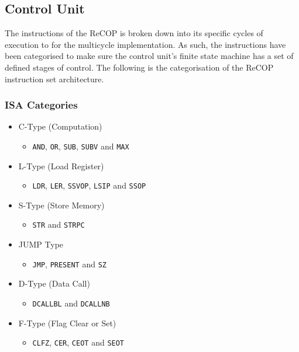 \documentclass[]{article}
\begin{document}
	\subsection{Control Unit}
	The instructions of the ReCOP is broken down into its specific cycles of execution to for the multicycle implementation. As such, the instructions have been categorised to make sure the control unit’s finite state machine has a set of defined stages of control. The following is the categorisation of the ReCOP instruction set architecture.
	
	\subsubsection{ISA Categories}
	\begin{itemize}
		\item C-Type (Computation)
		\begin{itemize}
			\item \texttt{AND}, \texttt{OR}, \texttt{SUB}, \texttt{SUBV} and \texttt{MAX} 
		\end{itemize}
		
		\item L-Type (Load Register)
		\begin{itemize}
			\item \texttt{LDR}, \texttt{LER}, \texttt{SSVOP}, \texttt{LSIP} and \texttt{SSOP}
		\end{itemize}
		
		\item S-Type (Store Memory)
		\begin{itemize}
			\item \texttt{STR} and \texttt{STRPC}
		\end{itemize}
		
		\item JUMP Type
		\begin{itemize}
			\item \texttt{JMP}, \texttt{PRESENT} and \texttt{SZ}
		\end{itemize}
		\item D-Type (Data Call)
		\begin{itemize}
			\item \texttt{DCALLBL} and \texttt{DCALLNB}
		\end{itemize}
		
		\item F-Type (Flag Clear or Set)
		\begin{itemize}
			\item \texttt{CLFZ}, \texttt{CER}, \texttt{CEOT} and \texttt{SEOT}
		\end{itemize}
		
		
	\end{itemize}
	
\end{document}
